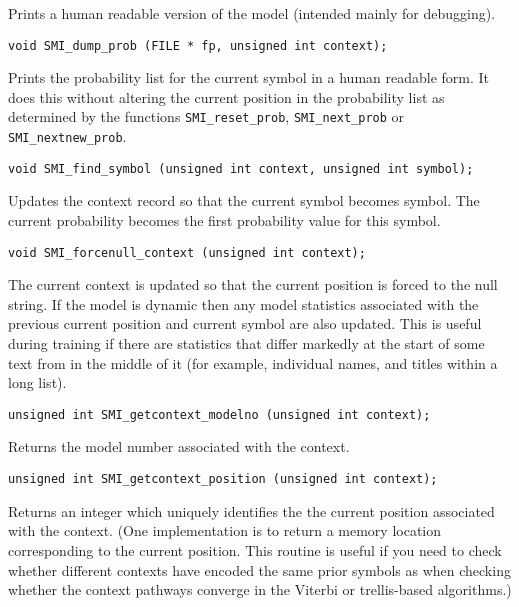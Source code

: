 \documentclass[11pt]{article}
\begin{document}
{\vspace{-0.2cm}
Prints a human readable version of the model (intended mainly for debugging).

\begin{verbatim}
void SMI_dump_prob (FILE * fp, unsigned int context);
\end{verbatim}

\vspace{-0.2cm}
Prints the probability list for the current symbol in a human readable form.
It does this without altering the current position in the probability list as determined
by the functions \verb|SMI_reset_prob|, \verb|SMI_next_prob| or \verb|SMI_nextnew_prob|.

\begin{verbatim}
void SMI_find_symbol (unsigned int context, unsigned int symbol);
\end{verbatim}

\vspace{-0.2cm}
Updates the context record so that the current symbol becomes symbol. The
current probability becomes the first probability value for this symbol.

\begin{verbatim}
void SMI_forcenull_context (unsigned int context);
\end{verbatim}

\vspace{-0.2cm}
The current context is updated so that the current position is forced to the
null string. If the model is dynamic then any model statistics associated
with the previous current position and current symbol are also updated. This
is useful during training if there are statistics that differ markedly at
the start of some text from in the middle of it (for example, individual
names, and titles within a long list).

\begin{verbatim}
unsigned int SMI_getcontext_modelno (unsigned int context);
\end{verbatim}

\vspace{-0.2cm}
Returns the model number associated with the context.

\begin{verbatim}
unsigned int SMI_getcontext_position (unsigned int context);
\end{verbatim}

\vspace{-0.2cm}
Returns an integer which uniquely identifies the the current position
associated with the context. (One implementation is to return a memory
location corresponding to the current position. This routine is useful if
you need to check whether different contexts have encoded the same prior
symbols as when checking whether the context pathways converge in the
Viterbi or trellis-based algorithms.)

}
\end{document}
